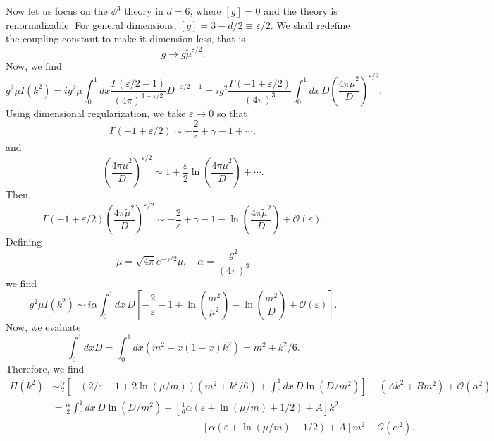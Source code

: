 Now let us focus on the $\phi^3$ theory in $d=6$, where $[g] =0$ and the theory is renormalizable. For general dimensions, $[g] = 3-d/2\equiv \varepsilon/2$. We shall redefine the coupling constant to make it dimension less, that is
\begin{equation}
    g \to g\tilde{\mu}^{\varepsilon/2}.
\end{equation}
Now, we find
\begin{equation}
    g^2\tilde{\mu}I(k^2) = i g^2\tilde{\mu}\int^1_0dx\frac{\Gamma(\varepsilon/2-1)}{(4\pi)^{3-\varepsilon/2}}D^{-\varepsilon/2+1} = ig^2\frac{\Gamma(-1+\varepsilon/2)}{(4\pi)^3}\int^1_0 dx\, D \left(\frac{4\pi\tilde{\mu}^2}{D}\right)^{\varepsilon/2}.
\end{equation}
Using dimensional regularization, we take $\varepsilon\to 0$ so that
\begin{equation}
    \Gamma(-1+\varepsilon/2) \sim -\frac{2}{\varepsilon}+\gamma-1+ \cdots,
\end{equation}
and
\begin{equation}
    \left(\frac{4\pi\tilde{\mu}^2}{D}\right)^{\varepsilon/2} \sim 1 + \frac{\varepsilon}{2}\ln\left(\frac{4\pi\tilde{\mu}^2}{D}\right) + \cdots.
\end{equation}
Then,
\begin{equation}
    \Gamma(-1+\varepsilon/2)\left(\frac{4\pi\tilde{\mu}^2}{D}\right)^{\varepsilon/2} \sim -\frac{2}{\varepsilon} + \gamma -1 - \ln\left(\frac{4\pi\tilde{\mu}^2}{D}\right) + \mathcal{O}(\varepsilon).
\end{equation}
Defining
\begin{equation}
    \mu = \sqrt{4\pi}e^{-\gamma/2}\tilde{\mu},\quad \alpha = \frac{g^2}{(4\pi)^3}
\end{equation}
we find
\begin{equation}
    g^2\tilde{\mu}I(k^2) \sim i\alpha \int^1_0 dx\,D\left[-\frac{2}{\varepsilon} -1 + \ln\left(\frac{m^2}{\mu^2}\right)- \ln\left(\frac{m^2}{D}\right) + \mathcal{O}(\varepsilon)\right].
\end{equation}
Now, we evaluate
\begin{equation}
    \int ^1_0 dx D = \int ^1_0 dx (m^2+x(1-x)k^2) = m^2 + k^2/6.
\end{equation}
Therefore, we find
\begin{equation}
\begin{aligned}
    \Pi(k^2) &\sim \frac{\alpha}{2}\left[-(2/\varepsilon+1+2\ln(\mu/m))(m^2+k^2/6)+\int^1_0 dx \,D\ln(D/m^2)\right] - (Ak^2 + Bm^2) + \mathcal{O}(\alpha^2)\\
    &= \frac{\alpha}{2}\int^1_0 dx \,D\ln(D/m^2) - \left[\frac{1}{6}\alpha(\varepsilon+\ln(\mu/m)+1/2) + A\right]k^2 \\
    &\qquad \qquad\qquad\qquad\qquad\qquad\qquad- \left[\alpha(\varepsilon+\ln(\mu/m)+1/2) + A\right]m^2 + \mathcal{O}(\alpha^2).
\end{aligned}
\end{equation}
